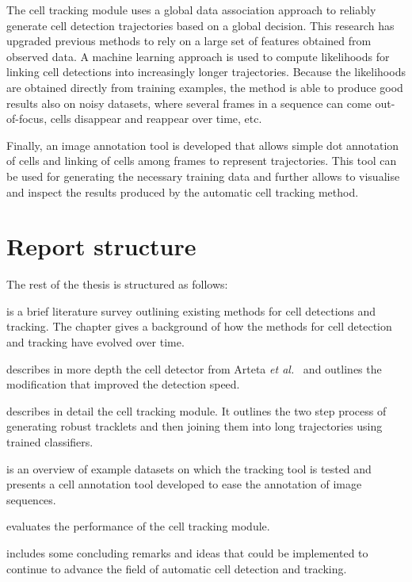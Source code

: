 		The cell tracking module uses a global data association approach to reliably generate cell detection trajectories based on a global decision. This research has upgraded previous methods to rely on a large set of features obtained from observed data. A machine learning approach is used to compute likelihoods for linking cell detections into increasingly longer trajectories. Because the likelihoods are obtained directly from training examples, the method is able to produce good results also on noisy datasets, where several frames in a sequence can come out-of-focus, cells disappear and reappear over time, etc.
		
		Finally, an image annotation tool is developed that allows simple dot annotation of cells and linking of cells among frames to represent trajectories. This tool can be used for generating the necessary training data and further allows to visualise and inspect the results produced by the automatic cell tracking method.
		
	\section{Report structure \statusfirstdraft}
		The rest of the thesis is structured as follows:
		
		 is a brief literature survey outlining existing methods for cell detections and tracking. The chapter gives a background of how the methods for cell detection and tracking have evolved over time.
		
		 describes in more depth the cell detector from Arteta \emph{et al.}~\cite{arteta12} and outlines the modification that improved the detection speed.
		
		 describes in detail the cell tracking module. It outlines the two step process of generating robust tracklets and then joining them into long trajectories using trained classifiers.
	
		 is an overview of example datasets on which the tracking tool is tested and presents a cell annotation tool developed to ease the annotation of image sequences.
		
		 evaluates the performance of the cell tracking module. 
		
		 includes some concluding remarks and ideas that could be implemented to continue to advance the field of automatic cell detection and tracking.